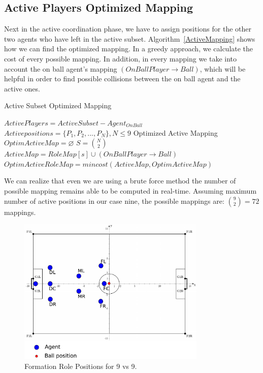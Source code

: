 \subsection{Active Players Optimized Mapping}
Next in the active coordination phase, we have to assign positions for the other two agents who have left in the active subset. Algorithm~\ref{ActiveMapping} shows how we can find the optimized mapping. In a greedy approach, we calculate the cost of every possible mapping. In addition, in every mapping we take into account the on ball agent's mapping $(OnBallPlayer \rightarrow Ball)$, which will be helpful in order to find possible collisions between the on ball agent and the active ones.
\begin{algorithm}[ht!]
\caption{Active Subset Optimized Mapping}
\label{ActiveMapping}
\begin{algorithmic}[1]
$ActivePlayers = ActiveSubset - Agent_{OnBall} $
$Activepositions = \lbrace P_{1},P_{2},...,P_{N} \rbrace, N\leq 9 $
Optimized Active Mapping
\STATE $OptimActiveMap = \varnothing $
\STATE $S = {{N}\choose{2}}$
\STATE $ActiveMap = RoleMap[s] \cup (OnBallPlayer \rightarrow Ball)$
\STATE $OptimActiveRoleMap = mincost(ActiveMap,OptimActiveMap)$
\ENDFOR
\end{algorithmic}
\end{algorithm}
We can realize that even we are using a brute force method the number of possible mapping remains able to be computed in real-time. Assuming maximum number of active positions in our case nine, the possible mappings are: ${{9}\choose{2}} = 72$ mappings.


\begin{figure}[t!]
\centering
  \includegraphics[width=0.8\textwidth]{Chapter4/figures/Formation9_0.pdf}
  \caption{Formation Role Positions for 9 vs 9.} 
  \label{fig:Formation9_0}
\end{figure}



